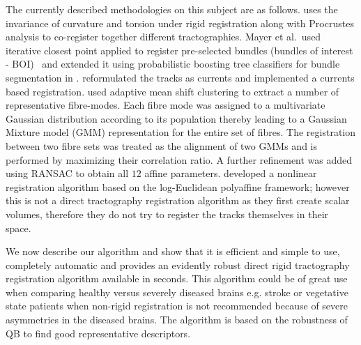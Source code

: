 \documentclass[preprint,authoryear,a4paper,10pt,onecolumn]{elsarticle}
\begin{document}
The currently described methodologies on this subject are as follows.
\citet{leemans2006multiscale} uses the invariance of
curvature and torsion under rigid registration along with Procrustes
analysis to co-register together different tractographies. Mayer et
al.~used iterative closest point applied to register pre-selected
bundles (bundles of interest - BOI)~\citep{mayer2008bundles,mayerdirect} and extended it using probabilistic boosting tree
classifiers for bundle segmentation
in \citep{mayer2011supervised}. \citet{durrleman2010registration} reformulated the tracks as currents
and implemented a currents based registration. \citep{zvitia2008adaptive,Zvitia2010} used adaptive mean
shift clustering to extract a number of representative
fi{}bre-modes. Each fibre mode was assigned to a multivariate Gaussian
distribution according to its population thereby leading to a Gaussian
Mixture model (GMM) representation for the entire set of fibres. The
registration between two fibre sets was treated as the alignment of two
GMMs and is performed by maximizing their correlation ratio. A further
refinement was added using RANSAC \citep{fischler1981random} to obtain all
$12$ affine parameters. \citet{ZiyanMICCAI07} developed a
nonlinear registration algorithm based on the log-Euclidean polyaffine
framework\citep{Arsigny2009}; however this is not a direct tractography
registration algorithm as they first create scalar volumes, therefore
they do not try to register the tracks themselves in their space.

We now describe our algorithm and show that it is efficient and simple
to use, completely automatic and provides an evidently robust direct
rigid tractography registration algorithm available in seconds. This
algorithm could be of great use when comparing healthy versus severely
diseased brains e.g. stroke or vegetative state patients when non-rigid
registration is not recommended because of severe asymmetries in the
diseased brains. The algorithm is based on the robustness of QB to find
good representative descriptors.
\end{document}
